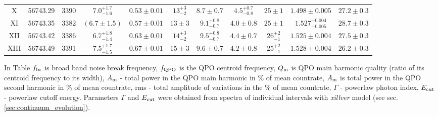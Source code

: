 \documentclass[a4paper,fleqn,usenatbib]{mnras}
\begin{document}
\begin{table}
\begin{tabular}{|c|c|c|c|c|c|c|c|c|c|c|}
X & 56743.29 & 3390 & $7.0_{-1.6}^{+1.7}$ & $0.53\pm0.01$ & $13_{-2}^{+3}$ & $8.7\pm0.7$ & $4.5_{-0.8}^{+0.7}$ & $25\pm1$ & $1.498\pm0.005$ & $27.2\pm0.3$ \\
XI & 56743.35 & 3382 & $(6.7\pm1.5)$ & $0.57\pm0.01$ & $13\pm3$ & $9.1_{-0.7}^{+0.8}$ & $4.0\pm0.8$ & $25\pm1$ & $1.527_{-0.005}^{+0.004}$ & $28.7\pm0.3$ \\
XII & 56743.42 & 3386 & $6.7_{-1.4}^{+1.8}$ & $0.63\pm0.01$ & $14_{-2}^{+3}$ & $9.5_{-0.7}^{+0.8}$ & $4.4\pm0.7$ & $26_{-1}^{+2}$ & $1.525\pm0.004$ & $27.5\pm0.3$ \\
XIII & 56743.49 & 3391 & $7.5_{-1.5}^{+1.7}$ & $0.67\pm0.01$ & $15\pm3$ & $9.6\pm0.7$ & $4.2\pm0.8$ & $25_{-1}^{+2}$ & $1.528\pm0.004$ & $26.2\pm0.3$ \\
\hline
\end{tabular}
\begin{flushleft}
        In Table $f_{\rm br}$ is broad band noise break frequency, $f_{\rm QPO}$ is the QPO centroid frequency, $Q_{\rm m}$ is QPO main harmonic quality (ratio of its centroid frequency to its width), $A_{\rm m}$ - total power in the QPO main harmonic in \% of mean countrate, $A_{\rm m}$ is total power in the QPO second harmonic in \% of mean countrate, rms - total amplitude of variations in the \% of mean countrate, $\Gamma$ - powerlaw photon index, $E_{\rm cut}$ - powerlaw cutoff energy. Parameters $\Gamma$ and $E_{\rm cut}$ were obtained from spectra of individual intervals with {\it xillver} model (see sec.\ref{sec:continuum_evolution}).
\end{flushleft}
\end{table}

\end{document}
